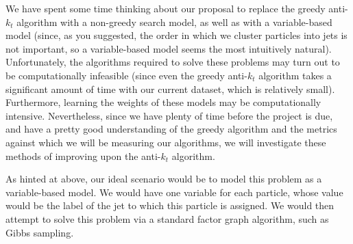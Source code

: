 \documentclass[12pt]{article}
\numberwithin{equation}{section}
\theoremstyle{definition}
\begin{document}
We have spent some time thinking about our proposal to replace the greedy anti-$k_t$ algorithm with a non-greedy search model, as well as with a variable-based model (since, as you suggested, the order in which we cluster particles into jets is not important, so a variable-based model seems the most intuitively natural). Unfortunately, the algorithms required to solve these problems may turn out to be computationally infeasible (since even the greedy anti-$k_t$ algorithm takes a significant amount of time with our current dataset, which is relatively small). Furthermore, learning the weights of these models may be computationally intensive. Nevertheless, since we have plenty of time before the project is due, and have a pretty good understanding of the greedy algorithm and the metrics against which we will be measuring our algorithms, we will investigate these methods of improving upon the anti-$k_t$ algorithm.

As hinted at above, our ideal scenario would be to model this problem as a variable-based model. We would have one variable for each particle, whose value would be the label of the jet to which this particle is assigned. We would then attempt to solve this problem via a standard factor graph algorithm, such as Gibbs sampling.

\nocite{ref:cacciari,ref:atlasPileup,ref:cacciari2,ref:cacciari3}



\end{document}
